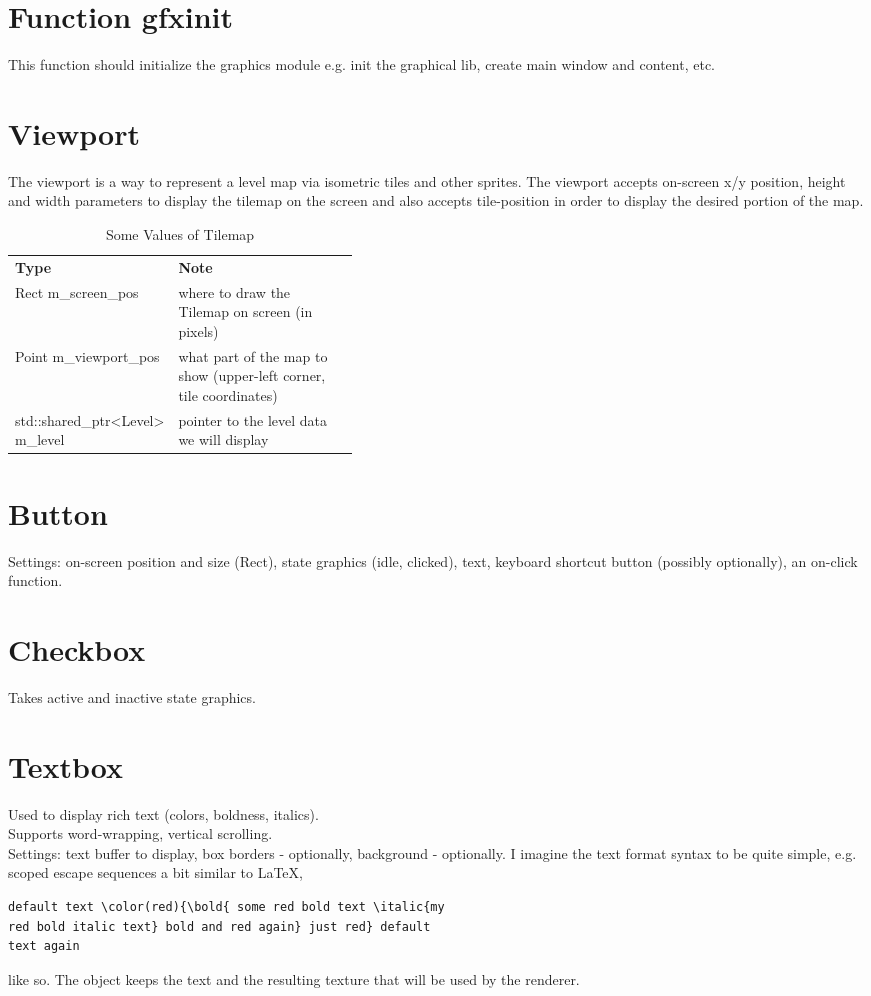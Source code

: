 \documentclass[a4paper,10pt]{book}
\begin{document}
\section{Function \enginenamespace{}gfxinit}
This function should initialize the graphics module e.g. init the graphical lib,
create main window and content, etc.
\section{\enginenamespace{}Viewport}
The viewport is a way to represent a level map via isometric tiles and other sprites.
The viewport accepts on-screen x/y position, height and width parameters to
display the tilemap on the screen and also accepts tile-position in order to
display the desired portion of the map.
\begin{table}[h]
  \caption{Some Values of \enginenamespace{}Tilemap}
  \begin{tabular}{p{0.4\linewidth} p{}}
    \textbf{Type} & \textbf{Note} \\
    \enginenamespace{}Rect m\_screen\_pos & where to draw the Tilemap on screen (in pixels) \\
    \enginenamespace{}Point m\_viewport\_pos & what part of the map to show (upper-left corner,
                                               tile coordinates) \\
    std::shared\_ptr<\enginenamespace{}Level> m\_level & pointer to the level data we will display \\
  \end{tabular}
\end{table}
\section{\enginenamespace{}Button}
Settings: on-screen position and size (Rect), state graphics (idle, clicked),
text, keyboard shortcut button (possibly optionally), an on-click function.
\section{\enginenamespace{}Checkbox}
Takes active and inactive state graphics.
\section{\enginenamespace{}Textbox}
Used to display rich text (colors, boldness, italics). \\
Supports word-wrapping, vertical scrolling. \\
Settings: text buffer to display, box borders - optionally, background -
optionally. I imagine the text format syntax to be quite simple, e.g. scoped
escape sequences a bit similar to LaTeX,
\begin{verbatim}
default text \color(red){\bold{ some red bold text \italic{my
red bold italic text} bold and red again} just red} default
text again
\end{verbatim}
like so.
The object keeps the text and the resulting texture that will be used by the
renderer.
\end{document}
